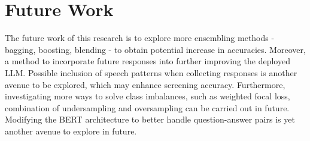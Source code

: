 \section{Future Work}

The future work of this research is to explore more ensembling methods - bagging, boosting, blending - to obtain potential increase in accuracies. Moreover, a method to incorporate future responses into further improving the deployed LLM. Possible inclusion of speech patterns when collecting responses is another avenue to be explored, which may enhance screening accuracy. Furthermore, investigating more ways to solve class imbalances, such as weighted focal loss, combination of undersampling and oversampling can be carried out in future. Modifying the BERT architecture to better handle question-answer pairs is yet another avenue to explore in future.  


\endinput



 

